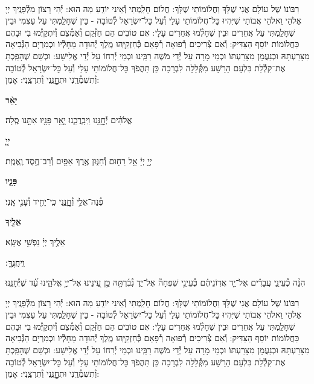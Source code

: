 \documentclass[twoside, openany, parskip=half, 11pt]{book}
\begin{document}
\\

רִבּוֹנוֹ שֶׁל עוֹלָם אֲנִי שֶׁלָּךְ וַחֲלוֹמוֹתַי שֶׁלָּךְ: חֲלוֹם חָלַֽמְתִּי וְ֯אֵינִי יוֹדֵֽעַ מַה הוּא: יְ֯הִי רָצוֹן מִלְּ֯פָנֶֽיךָ יְיָ אֱלֹהַי וֵאלֹהֵי אֲבוֹתַי שֶׁיִּהְיוּ כׇּל־חֲלוֹמוֹתַי עָלַי וְ֯עַל כׇּל־יִשְׂרָאֵל לְ֯טוֹבָה - בֵּין שֶׁחָלַֽמְתִּי עַל עַצְמִי וּבֵין שֶׁחָלַֽמְתִּי עַל אֲחֵרִים וּבֵין שֶׁחָלְ֯מוּ אֲחֵרִים עָלָי: אִם טוֹבִים הֵם חַזְּ֯קֵם וְ֯אַמְּ֯צֵם וְ֯יִתְקַיְּ֯מוּ בִי וּבָהֶם כַּחֲלוֹמוֹת יוֹסֵף הַצַּדִּיק: וְ֯אִם צְ֯רִיכִים רְ֯פוּאָה רְ֯פָאֵם כְּ֯חִזְקִיָּֽהוּ מֶֽלֶךְ יְ֯הוּדָה מֵחָלְ֯יוֹ וּכְמִרְיָם הַנְּ֯בִיאָה מִצָּרַעְתָּהּ וּכְנַעֲמָן מִצָּרַעְתּוֹ וּכְמֵי מָרָה עַל יְ֯דֵי מֹשֶׁה רַבֵּֽינוּ וּכְמֵי יְ֯רִחוֹ עַל יְ֯דֵי אֱלִישָׁע: וּכְשֵׁם שֶׁהָפַֽכְתָּ אֶת־קִלְ֯לַת בִּלְעָם הָרָשָׁע מִקְּ֯לָלָה לִבְרָכָה כֵּן תַּהֲפֹךְ כׇּל־חֲלוֹמוֹתַי עָלַי וְ֯עַל כׇּל־יִשְׂרָאֵל לְ֯טוֹבָה וְ֯תִשְׁמְ֯רֵֽנִי וּתְחׇׇׇׇׇׇׇׇנֵּֽנִי וְ֯תִרְצֵֽנִי: אָמֵן:



\textbf{יָאֵ֨ר}
\hfill \begin{footnotesize}
אֱלֹהִ֗ים יְ֯חׇׇׇׇׇׇנֵּ֥נוּ וִֽיבָֽרֲכֵ֑נוּ יָ֤אֵ֥ר פָּנָ֖יו אִתָּ֣נוּ סֶֽלָה׃\\
\end{footnotesize}
\textbf{יְיָ֧}
\hfill \begin{footnotesize}
יְיָ֣ יְיָ֔ אֵ֥ל רַח֖וּם וְ֯חַנּ֑וּן אֶ֥רֶךְ אַפַּ֖יִם וְ֯רַב־חֶ֥סֶד וֶֽאֱמֶֽת׃\\
\end{footnotesize}
\textbf{פָּנָ֛יו}
\hfill \begin{footnotesize}
פְּ֯נֵה־אֵלַ֥י וְ֯חׇׇׇׇׇׇׇׇנֵּ֑נִי כִּֽי־יָחִ֖יד וְ֯עָנִ֣י אָֽנִי׃\\
\end{footnotesize}
\textbf{אֵלֶ֖יךָ}
\hfill \begin{footnotesize}
אֵלֶ֥יךָ יְיָ֗ נַפְשִׁ֥י אֶשָּֽׂא׃\\
\end{footnotesize}
\textbf{וִֽיחֻנֶּֽךָּ}
׃ \hfill \begin{footnotesize}
הִנֵּ֨ה כְ֯עֵינֵ֢י עֲבָדִ֡ים אֶל־יַ֤ד אֲדֽוֹנֵיהֶ֗ם כְּ֯עֵינֵ֣י שִׁפְחָה֘ אֶל־יַד֢ גְּ֯בִ֫רְתָּ֥הּ כֵּ֣ן עֵ֭ינֵינוּ אֶל־יְיָ֣ אֱלֹהֵ֑ינוּ עַ֝֗ד שֶׁיְּ֯חָנֵּֽנוּ׃
\end{footnotesize}


רִבּוֹנוֹ שֶׁל עוֹלָם אֲנִי שֶׁלָּךְ וַחֲלוֹמוֹתַי שֶׁלָּךְ: חֲלוֹם חָלַֽמְתִּי וְ֯אֵינִי יוֹדֵֽעַ מַה הוּא: יְ֯הִי רָצוֹן מִלְּ֯פָנֶֽיךָ יְיָ אֱלֹהַי וֵאלֹהֵי אֲבוֹתַי שֶׁיִּהְיוּ כׇּל־חֲלוֹמוֹתַי עָלַי וְ֯עַל כׇּל־יִשְׂרָאֵל לְ֯טוֹבָה - בֵּין שֶׁחָלַֽמְתִּי עַל עַצְמִי וּבֵין שֶׁחָלַֽמְתִּי עַל אֲחֵרִים וּבֵין שֶׁחָלְ֯מוּ אֲחֵרִים עָלָי: אִם טוֹבִים הֵם חַזְּ֯קֵם וְ֯אַמְּ֯צֵם וְ֯יִתְקַיְּ֯מוּ בִי וּבָהֶם כַּחֲלוֹמוֹת יוֹסֵף הַצַּדִּיק: וְ֯אִם צְ֯רִיכִים רְ֯פוּאָה רְ֯פָאֵם כְּ֯חִזְקִיָּֽהוּ מֶֽלֶךְ יְ֯הוּדָה מֵחָלְ֯יוֹ וּכְמִרְיָם הַנְּ֯בִיאָה מִצָּרַעְתָּהּ וּכְנַעֲמָן מִצָּרַעְתּוֹ וּכְמֵי מָרָה עַל יְ֯דֵי מֹשֶׁה רַבֵּֽינוּ וּכְמֵי יְ֯רִחוֹ עַל יְ֯דֵי אֱלִישָׁע: וּכְשֵׁם שֶׁהָפַֽכְתָּ אֶת־קִלְ֯לַת בִּלְעָם הָרָשָׁע מִקְּ֯לָלָה לִבְרָכָה כֵּן תַּהֲפֹךְ כׇּל־חֲלוֹמוֹתַי עָלַי וְ֯עַל כׇּל־יִשְׂרָאֵל לְ֯טוֹבָה וְ֯תִשְׁמְ֯רֵֽנִי וּתְחׇׇׇׇׇׇׇׇנֵּֽנִי וְ֯תִרְצֵֽנִי: אָמֵן:
\end{document}
